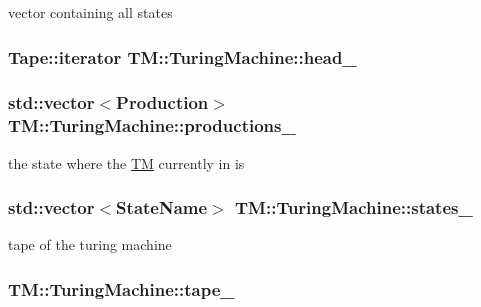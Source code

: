 vector containing all states 

\hypertarget{classTM_1_1TuringMachine_a16c476c503a878de6f354339a283ca3b}{
\subsubsection[{head\-\_\-}]{\setlength{\rightskip}{0pt plus 5cm}\-Tape\-::iterator {\bf \-T\-M\-::\-Turing\-Machine\-::head\-\_\-}}}\label{dd/d15/classTM_1_1TuringMachine_a16c476c503a878de6f354339a283ca3b}
\hypertarget{classTM_1_1TuringMachine_a1aacd1eca81b8f4ab37030b3cda19d13}{
\subsubsection[{productions\-\_\-}]{\setlength{\rightskip}{0pt plus 5cm}std\-::vector$<${\bf \-Production}$>$ {\bf \-T\-M\-::\-Turing\-Machine\-::productions\-\_\-}}}\label{dd/d15/classTM_1_1TuringMachine_a1aacd1eca81b8f4ab37030b3cda19d13}


the state where the \hyperlink{namespaceTM}{\-T\-M} currently in is 

\hypertarget{classTM_1_1TuringMachine_aa83fb53ce10f185f3f1859533cc20e0b}{
\subsubsection[{states\-\_\-}]{\setlength{\rightskip}{0pt plus 5cm}std\-::vector$<${\bf \-State\-Name}$>$ {\bf \-T\-M\-::\-Turing\-Machine\-::states\-\_\-}}}\label{dd/d15/classTM_1_1TuringMachine_aa83fb53ce10f185f3f1859533cc20e0b}


tape of the turing machine 

\hypertarget{classTM_1_1TuringMachine_a4c95b19fbea6a3d73b68dea36cd389a0}{
\subsubsection[{tape\-\_\-}]{ {\bf \-T\-M\-::\-Turing\-Machine\-::tape\-\_\-}}}\label{dd/d15/classTM_1_1TuringMachine_a4c95b19fbea6a3d73b68dea36cd389a0}



